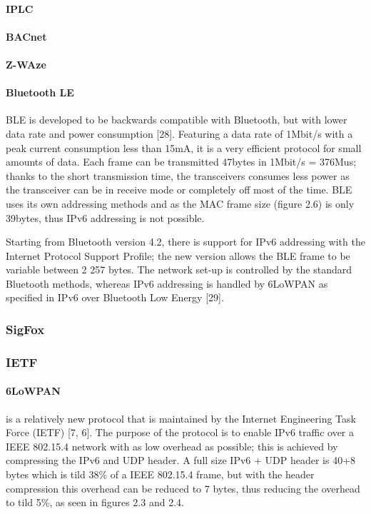\paragraph{IPLC}
\paragraph{BACnet}
\paragraph{Z-WAze}
\paragraph{Bluetooth LE}
BLE is developed to be backwards compatible with Bluetooth,
	but with lower data rate and power consumption [28].
Featuring a data rate of 1Mbit/s with a peak current consumption less than 15mA,
	it is a very efficient protocol for small amounts of data.
Each frame can be transmitted 47bytes in 1Mbit/s = 376Mus;
	thanks to the short transmission time,
	the transceivers consumes less power as the transceiver can be in receive mode or completely off most of the time.
BLE uses its own addressing methods and as the MAC frame size (figure 2.6) is only 39bytes,
	thus IPv6 addressing is not possible.

Starting from Bluetooth version 4.2,
	there is support for IPv6 addressing with the Internet Protocol Support Profile;
	the new version allows the BLE frame to be variable between 2 257 bytes.
The network set-up is controlled by the standard Bluetooth methods,
	whereas IPv6 addressing is handled by 6LoWPAN as specified in IPv6 over Bluetooth Low Energy [29].


\subsubsection{SigFox}

\subsubsection{IETF}
\paragraph{6LoWPAN} 
is a relatively new protocol that is maintained by the Internet
Engineering Task Force (IETF) [7, 6].
The purpose of the protocol is to enable IPv6 traffic over a IEEE 802.15.4 network with as low overhead as possible;
	this is achieved by compressing the IPv6 and UDP header.
A full size IPv6 + UDP header is 40+8 bytes which is tild 38\% of a IEEE 802.15.4
frame,
	but with the header compression this overhead can be reduced to 7 bytes,
	thus reducing the overhead to tild 5\%,
	as seen in figures 2.3 and 2.4.


